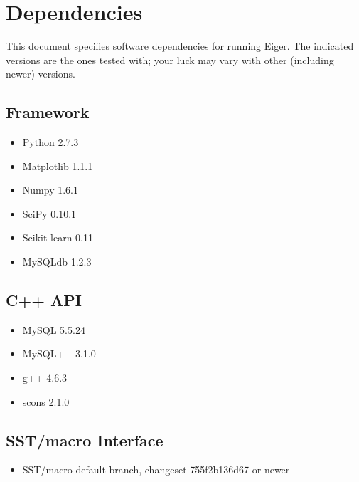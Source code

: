 \section{Dependencies}
\label{sec:dep}
This document specifies software dependencies for running Eiger. 
The indicated versions are the ones tested with; your luck may 
vary with other (including newer) versions.

\subsection{Framework}
\begin{itemize}
\item Python 2.7.3
\item Matplotlib 1.1.1
\item Numpy 1.6.1
\item SciPy 0.10.1
\item Scikit-learn 0.11
\item MySQLdb 1.2.3
\end{itemize}

\subsection{C++ API}
\begin{itemize}
\item MySQL 5.5.24
\item MySQL++ 3.1.0
\item g++ 4.6.3
\item scons 2.1.0
\end{itemize}

\subsection{SST/macro Interface}
\begin{itemize}
\item SST/macro default branch, changeset 755f2b136d67 or newer
\end{itemize}
